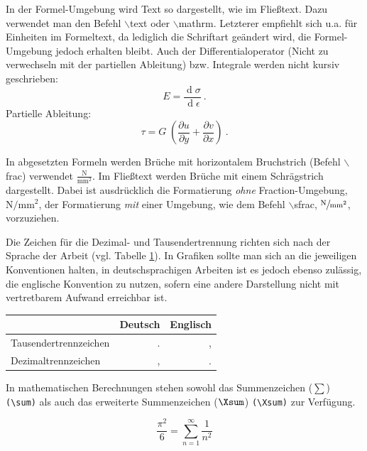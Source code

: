 In der Formel-Umgebung wird Text so dargestellt, wie im Fließtext. Dazu verwendet man den Befehl $\backslash$text oder $\backslash$mathrm. Letzterer empfiehlt sich u.a. für Einheiten im Formeltext, da lediglich die Schriftart geändert wird, die Formel-Umgebung jedoch erhalten bleibt. Auch der Differentialoperator (Nicht zu verwechseln mit der partiellen Ableitung) bzw. Integrale werden nicht kursiv geschrieben:
\begin{equation}
E=\frac{\operatorname{d} \! \sigma}{\operatorname{d} \! \epsilon} \:.
\end{equation}
Partielle Ableitung:
\begin{equation}
\tau=G \;\left(\frac{\partial u}{\partial y} + \frac{\partial v}{\partial x}\right) \:.
\end{equation}

In abgesetzten Formeln werden Brüche mit horizontalem Bruchstrich (Befehl $\backslash$frac{}{}) verwendet  $\mathrm{\frac{N}{mm^2}}$. Im Fließtext werden Brüche mit einem Schrägstrich dargestellt. Dabei ist ausdrücklich die Formatierung \emph{ohne} Fraction-Umgebung, $\mathrm{N/mm^2}$, der Formatierung \emph{mit} einer Umgebung, wie dem Befehl $\backslash$sfrac{}{}, $\mathrm{\sfrac{N}{mm^2}}$, vorzuziehen.

Die Zeichen für die Dezimal- und Tausendertrennung richten sich nach der Sprache der Arbeit (vgl. Tabelle \ref{tab:Trennzeichen}). In Grafiken sollte man sich an die jeweiligen Konventionen halten, in deutschsprachigen Arbeiten ist es jedoch ebenso zulässig, die englische Konvention zu nutzen, sofern eine andere Darstellung nicht mit vertretbarem Aufwand erreichbar ist.
\begin{table}
\centering
{}
\begin{tabular}{lrr}
\toprule
							& Deutsch	& Englisch\\
\midrule
Tausendertrennzeichen		& .			& ,\\
Dezimaltrennzeichen 		& ,			& .\\
\bottomrule
\end{tabular}
\label{tab:Trennzeichen}
\end{table}
%
In mathematischen Berechnungen stehen sowohl das Summenzeichen ($\sum$) \texttt{(\textbackslash sum)} als auch das erweiterte Summenzeichen ($\Xsum$) \texttt{(\textbackslash Xsum)} zur Verfügung.

$$\dfrac{\pi^2}{6} = \sum_{n=1}^\infty \dfrac{1}{n^2}$$


